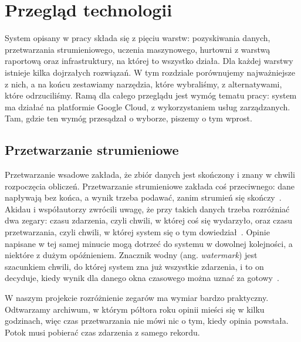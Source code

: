 \chapter{Przegląd technologii}
\label{chap:technology}


System opisany w pracy składa się z pięciu warstw: pozyskiwania danych, przetwarzania strumieniowego, uczenia maszynowego, hurtowni z warstwą raportową oraz infrastruktury, na której to wszystko działa.
Dla każdej warstwy istnieje kilka dojrzałych rozwiązań.
W tym rozdziale porównujemy najważniejsze z nich, a na końcu zestawiamy narzędzia, które wybraliśmy, z alternatywami, które odrzuciliśmy.
Ramą dla całego przeglądu jest wymóg tematu pracy: system ma działać na platformie Google Cloud, z wykorzystaniem usług zarządzanych.
Tam, gdzie ten wymóg przesądzał o wyborze, piszemy o tym wprost.

\section{Przetwarzanie strumieniowe}
\label{sec:tech-streaming}

Przetwarzanie wsadowe zakłada, że zbiór danych jest skończony i znany w chwili rozpoczęcia obliczeń.
Przetwarzanie strumieniowe zakłada coś przeciwnego: dane napływają bez końca, a wynik trzeba podawać, zanim strumień się skończy~\cite{kleppmann2017designing}.
Akidau i współautorzy zwrócili uwagę, że przy takich danych trzeba rozróżniać dwa zegary: czasu zdarzenia, czyli chwili, w której coś się wydarzyło, oraz czasu przetwarzania, czyli chwili, w której system się o tym dowiedział~\cite{akidau2015dataflow}.
Opinie napisane w tej samej minucie mogą dotrzeć do systemu w dowolnej kolejności, a niektóre z dużym opóźnieniem.
Znacznik wodny (ang. \textit{watermark}) jest szacunkiem chwili, do której system zna już wszystkie zdarzenia, i to on decyduje, kiedy wynik dla danego okna czasowego można uznać za gotowy~\cite{akidau2018streaming}.

W naszym projekcie rozróżnienie zegarów ma wymiar bardzo praktyczny.
Odtwarzamy archiwum, w którym półtora roku opinii mieści się w kilku godzinach, więc czas przetwarzania nie mówi nic o tym, kiedy opinia powstała.
Potok musi pobierać czas zdarzenia z samego rekordu.


